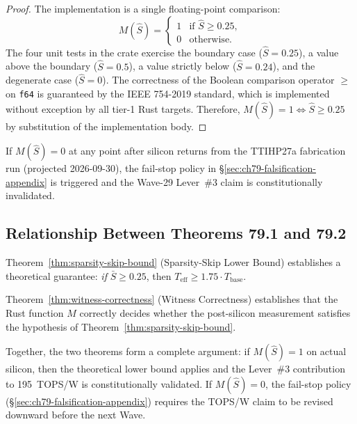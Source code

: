 \begin{proof}
The implementation is a single floating-point comparison:
\[
  M(\hat{S}) = \begin{cases}
    1 & \text{if } \hat{S} \geq 0.25, \\
    0 & \text{otherwise.}
  \end{cases}
\]
The four unit tests in the crate exercise the boundary case
($\hat{S} = 0.25$), a value above the boundary ($\hat{S} = 0.5$),
a value strictly below ($\hat{S} = 0.24$), and the degenerate
case ($\hat{S} = 0$).
The correctness of the Boolean comparison operator $\geq$ on
\texttt{f64} is guaranteed by the IEEE 754-2019 standard, which
is implemented without exception by all tier-1 Rust targets.
Therefore, $M(\hat{S}) = 1 \iff \hat{S} \geq 0.25$ by
substitution of the implementation body.
\end{proof}

\begin{corollary}
\label{cor:witness-fail-stop}
If $M(\hat{S}) = 0$ at any point after silicon returns from the
TTIHP27a fabrication run (projected 2026-09-30), the fail-stop
policy in §\ref{sec:ch79-falsification-appendix} is triggered
and the Wave-29 Lever~\#3 claim is constitutionally invalidated.
\end{corollary}

\subsection{Relationship Between Theorems 79.1 and 79.2}
\label{subsec:ch79-theorem-relationship}

Theorem~\ref{thm:sparsity-skip-bound} (Sparsity-Skip Lower Bound)
establishes a theoretical guarantee: \emph{if} $\bar{S} \geq 0.25$,
then $T_{\mathrm{eff}} \geq 1.75 \cdot T_{\mathrm{base}}$.

Theorem~\ref{thm:witness-correctness} (Witness Correctness) establishes
that the Rust function $M$ correctly decides whether the post-silicon
measurement satisfies the hypothesis of Theorem~\ref{thm:sparsity-skip-bound}.

Together, the two theorems form a complete argument: if $M(\hat{S}) = 1$
on actual silicon, then the theoretical lower bound applies and
the Lever~\#3 contribution to 195~TOPS/W is constitutionally validated.
If $M(\hat{S}) = 0$, the fail-stop policy (§\ref{sec:ch79-falsification-appendix})
requires the TOPS/W claim to be revised downward before the next
Wave.

